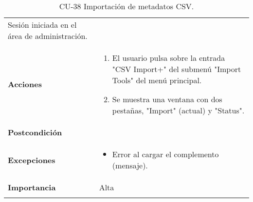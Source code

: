 \begin{longtable}[]{@{}ll@{}}
\begin{minipage}[t]{0.75\columnwidth}
Sesión iniciada en el área de administración.\strut
\end{minipage}\tabularnewline
\begin{minipage}[t]{0.20\columnwidth}\raggedright
\textbf{Acciones}\strut
\end{minipage} & \begin{minipage}[t]{0.75\columnwidth}\raggedright
\begin{enumerate}
\def\labelenumi{\arabic{enumi}.}
\tightlist
\item
  El usuario pulsa sobre la entrada "CSV Import+" del submenú "Import
  Tools" del menú principal.
\item
  Se muestra una ventana con dos pestañas, "Import" (actual) y "Status".
\end{enumerate}\strut
\end{minipage}\tabularnewline
\begin{minipage}[t]{0.20\columnwidth}\raggedright
\textbf{Postcondición}\strut
\end{minipage} & \begin{minipage}[t]{0.75\columnwidth}\raggedright
\strut
\end{minipage}\tabularnewline
\begin{minipage}[t]{0.20\columnwidth}\raggedright
\textbf{Excepciones}\strut
\end{minipage} & \begin{minipage}[t]{0.75\columnwidth}\raggedright
\begin{itemize}
\tightlist
\item
  Error al cargar el complemento (mensaje).
\end{itemize}\strut
\end{minipage}\tabularnewline
\begin{minipage}[t]{0.20\columnwidth}\raggedright
\textbf{Importancia}\strut
\end{minipage} & \begin{minipage}[t]{0.75\columnwidth}\raggedright
Alta\strut
\end{minipage}\tabularnewline
\bottomrule
\caption{CU-38 Importación de metadatos CSV.}
\end{longtable}

